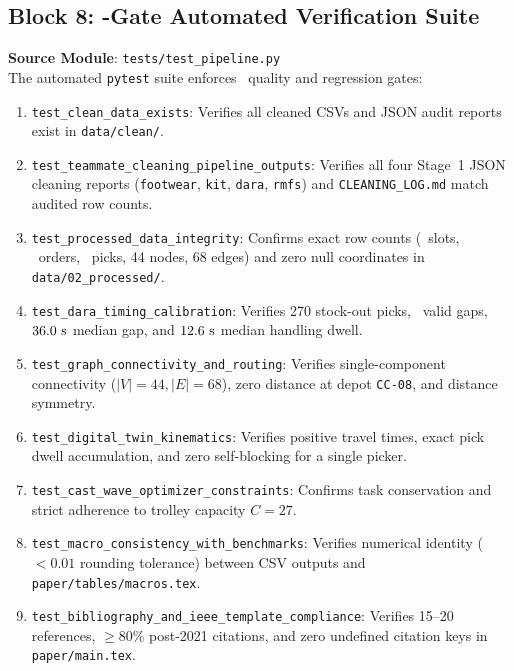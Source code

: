 \documentclass[11pt,a4paper]{article}
\begin{document}
\subsection{Block 8: \AutomatedTestCount-Gate Automated Verification Suite}
\noindent\textbf{Source Module}: \texttt{tests/test\_pipeline.py}\\[0.5em]

The automated \texttt{pytest} suite enforces \AutomatedTestCount~quality and regression gates:
\begin{enumerate}[leftmargin=*]
    \item \texttt{test\_clean\_data\_exists}: Verifies all cleaned CSVs and JSON audit reports exist in \texttt{data/clean/}.
    \item \texttt{test\_teammate\_cleaning\_pipeline\_outputs}: Verifies all four Stage~1 JSON cleaning reports (\texttt{footwear}, \texttt{kit}, \texttt{dara}, \texttt{rmfs}) and \texttt{CLEANING\_LOG.md} match audited row counts.
    \item \texttt{test\_processed\_data\_integrity}: Confirms exact row counts (\TotalLocations~slots, \TotalOrderLines~orders, \TotalPicks~picks, 44 nodes, 68 edges) and zero null coordinates in \texttt{data/02\_processed/}.
    \item \texttt{test\_dara\_timing\_calibration}: Verifies 270 stock-out picks, \DaRAValidGaps~valid gaps, $36.0\text{ s}$ median gap, and $12.6\text{ s}$ median handling dwell.
    \item \texttt{test\_graph\_connectivity\_and\_routing}: Verifies single-component connectivity ($|V|=44, |E|=68$), zero distance at depot \texttt{CC-08}, and distance symmetry.
    \item \texttt{test\_digital\_twin\_kinematics}: Verifies positive travel times, exact pick dwell accumulation, and zero self-blocking for a single picker.
    \item \texttt{test\_cast\_wave\_optimizer\_constraints}: Confirms task conservation and strict adherence to trolley capacity $C = 27$.
    \item \texttt{test\_macro\_consistency\_with\_benchmarks}: Verifies numerical identity ($< 0.01$ rounding tolerance) between CSV outputs and \texttt{paper/tables/macros.tex}.
    \item \texttt{test\_bibliography\_and\_ieee\_template\_compliance}: Verifies 15--20 references, $\ge 80\%$ post-2021 citations, and zero undefined citation keys in \texttt{paper/main.tex}.

\end{enumerate}
\end{document}

